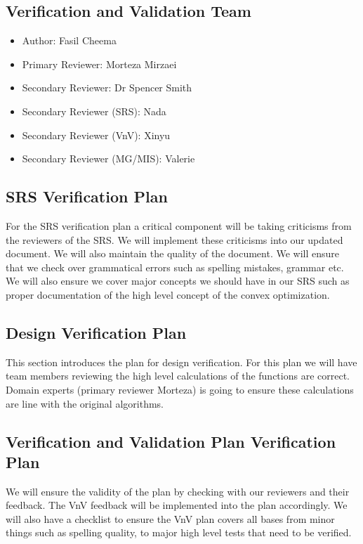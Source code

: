 \documentclass[12pt, titlepage]{article}
\begin{document}
\subsection{Verification and Validation Team}

\begin{itemize}
  \item Author: Fasil Cheema
  \item Primary Reviewer: Morteza Mirzaei
  \item Secondary Reviewer: Dr Spencer Smith
  \item Secondary Reviewer (SRS): Nada
  \item Secondary Reviewer (VnV): Xinyu
  \item Secondary Reviewer (MG/MIS): Valerie
\end{itemize}

\subsection{SRS Verification Plan}
For the SRS verification plan a critical component will be taking criticisms from the 
reviewers of the SRS. We will implement these criticisms into our updated document. 
We will also maintain the quality of the document. 
We will ensure that we check over grammatical errors such as spelling mistakes,
grammar etc. We will also ensure we cover major concepts we should have in our SRS such 
as proper documentation of the high level concept of the convex optimization.

\subsection{Design Verification Plan}


This section introduces the plan for design verification. For this plan we will have 
team members reviewing the high level calculations of the functions are correct.
Domain experts (primary reviewer Morteza) is going to ensure these calculations are line with the original 
algorithms.

\subsection{Verification and Validation Plan Verification Plan}

We will ensure the validity of the plan by checking with our reviewers and
their feedback. The VnV feedback will be implemented into the plan accordingly.
We will also have a checklist to ensure the VnV plan covers all bases from minor 
things such as spelling quality, to major high level tests that need to be verified.
\end{document}
